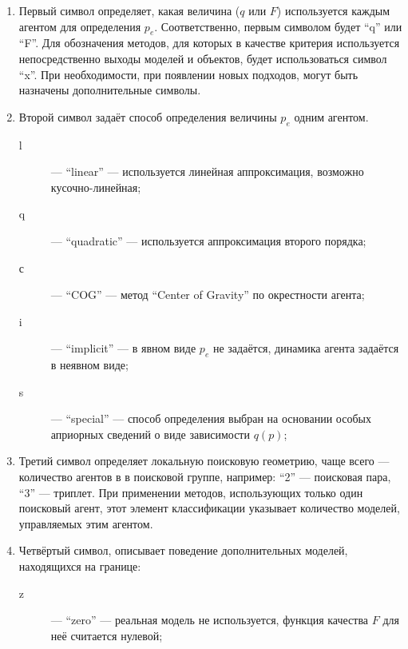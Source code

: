 \begin{enumerate}

  \item  Первый символ определяет, какая величина ($q$ или $F$) используется
    каждым агентом для определения $p_e$. Соответственно, первым символом
    будет ``q'' или ``F''.
    Для обозначения методов, для которых в качестве критерия используется
    непосредственно выходы моделей и объектов, будет использоваться символ ``x''.
    При необходимости, при появлении новых подходов,
    могут быть назначены дополнительные символы.

  \item
    Второй символ задаёт способ определения величины $p_e$
    одним агентом.

    \begin{description}

      \item[l]  --- ``linear'' --- используется линейная аппроксимация, возможно кусочно-линейная;

      \item[q]  --- ``quadratic'' --- используется аппроксимация второго порядка;

      \item[с] --- ``COG'' ---  метод ``Center of Gravity'' по окрестности агента;

      \item[i] --- ``implicit'' --- в явном виде $p_e$ не задаётся, динамика агента задаётся в неявном виде;

      \item[s] --- ``special'' --- способ определения выбран на основании особых априорных сведений о виде зависимости $q(p)$;

    \end{description}

  \item
    Третий символ определяет локальную поисковую геометрию, чаще всего --- количество агентов в
    в поисковой группе, например: ``2'' --- поисковая пара, ``3'' --- триплет.
    При применении методов, использующих только один поисковый агент,
    этот элемент классификации указывает количество моделей, управляемых этим агентом.

  \item
    Четвёртый символ, описывает
    поведение дополнительных моделей, находящихся на границе:
    \begin{description}

      \item[z]  --- ``zero'' --- реальная модель не используется, функция качества $F$ для неё считается нулевой;


\end{description}
\end{enumerate}
